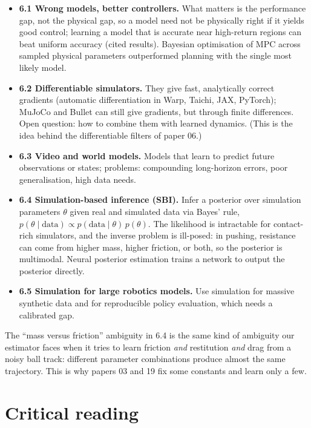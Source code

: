 \documentclass[11pt,a4paper]{article}
\begin{document}
\begin{itemize}
\item \textbf{6.1 Wrong models, better controllers.} What matters is the performance gap, not the
physical gap, so a model need not be physically right if it yields good control; learning a model
that is accurate near high-return regions can beat uniform accuracy (cited results). Bayesian
optimisation of MPC across sampled physical parameters outperformed planning with the single most
likely model.
\item \textbf{6.2 Differentiable simulators.} They give fast, analytically correct gradients
(automatic differentiation in Warp, Taichi, JAX, PyTorch); MuJoCo and Bullet can still give gradients, but
through finite differences. Open question: how to combine them with learned dynamics. (This is the idea behind
the differentiable filters of paper 06.)
\item \textbf{6.3 Video and world models.} Models that learn to predict future observations or
states; problems: compounding long-horizon errors, poor generalisation, high data needs.
\item \textbf{6.4 Simulation-based inference (SBI).} Infer a posterior over simulation parameters
$\theta$ given real and simulated data via Bayes' rule, $p(\theta\mid\text{data})\propto
p(\text{data}\mid\theta)\,p(\theta)$. The likelihood is intractable for contact-rich simulators, and
the inverse problem is ill-posed: in pushing, resistance can come from higher mass, higher friction,
or both, so the posterior is multimodal. Neural posterior estimation trains a network to output the
posterior directly.
\item \textbf{6.5 Simulation for large robotics models.} Use simulation for massive synthetic data
and for reproducible policy evaluation, which needs a calibrated gap.
\end{itemize}

\begin{ours}
The ``mass versus friction'' ambiguity in 6.4 is the same kind of ambiguity our estimator faces
when it tries to learn friction \emph{and} restitution \emph{and} drag from a noisy ball track:
different parameter combinations produce almost the same trajectory. This is why papers 03 and 19
fix some constants and learn only a few.
\end{ours}

\section{Critical reading}
\end{document}
